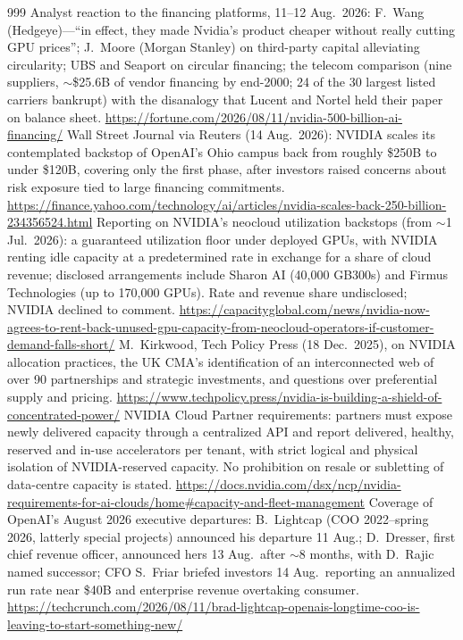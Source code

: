 \begin{thebibliography}{999}
 Analyst reaction to the financing platforms, 11--12 Aug.\ 2026: F.~Wang (Hedgeye)---``in effect, they made Nvidia's product cheaper without really cutting GPU prices''; J.~Moore (Morgan Stanley) on third-party capital alleviating circularity; UBS and Seaport on circular financing; the telecom comparison (nine suppliers, $\sim$\$25.6B of vendor financing by end-2000; 24 of the 30 largest listed carriers bankrupt) with the disanalogy that Lucent and Nortel held their paper on balance sheet. \url{https://fortune.com/2026/08/11/nvidia-500-billion-ai-financing/}
 Wall Street Journal via Reuters (14 Aug.\ 2026): NVIDIA scales its contemplated backstop of OpenAI's Ohio campus back from roughly \$250B to under \$120B, covering only the first phase, after investors raised concerns about risk exposure tied to large financing commitments. \url{https://finance.yahoo.com/technology/ai/articles/nvidia-scales-back-250-billion-234356524.html}
 Reporting on NVIDIA's neocloud utilization backstops (from $\sim$1 Jul.\ 2026): a guaranteed utilization floor under deployed GPUs, with NVIDIA renting idle capacity at a predetermined rate in exchange for a share of cloud revenue; disclosed arrangements include Sharon AI (40,000 GB300s) and Firmus Technologies (up to 170,000 GPUs). Rate and revenue share undisclosed; NVIDIA declined to comment. \url{https://capacityglobal.com/news/nvidia-now-agrees-to-rent-back-unused-gpu-capacity-from-neocloud-operators-if-customer-demand-falls-short/}
 M.~Kirkwood, Tech Policy Press (18 Dec.\ 2025), on NVIDIA allocation practices, the UK CMA's identification of an interconnected web of over 90 partnerships and strategic investments, and questions over preferential supply and pricing. \url{https://www.techpolicy.press/nvidia-is-building-a-shield-of-concentrated-power/}
 NVIDIA Cloud Partner requirements: partners must expose newly delivered capacity through a centralized API and report delivered, healthy, reserved and in-use accelerators per tenant, with strict logical and physical isolation of NVIDIA-reserved capacity. No prohibition on resale or subletting of data-centre capacity is stated. \url{https://docs.nvidia.com/dsx/ncp/nvidia-requirements-for-ai-clouds/home\#capacity-and-fleet-management}
 Coverage of OpenAI's August 2026 executive departures: B.~Lightcap (COO 2022--spring 2026, latterly special projects) announced his departure 11 Aug.; D.~Dresser, first chief revenue officer, announced hers 13 Aug.\ after $\sim$8 months, with D.~Rajic named successor; CFO S.~Friar briefed investors 14 Aug.\ reporting an annualized run rate near \$40B and enterprise revenue overtaking consumer. \url{https://techcrunch.com/2026/08/11/brad-lightcap-openais-longtime-coo-is-leaving-to-start-something-new/}

\end{thebibliography}
